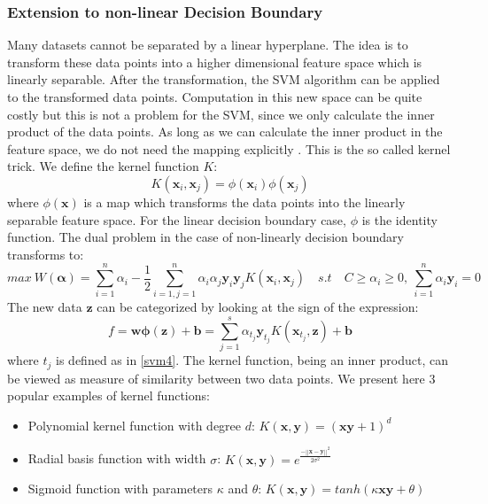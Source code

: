 \documentclass[a4paper,11pt,oneside]{article}
\begin{document}
\subsubsection*{Extension to non-linear Decision Boundary}
Many datasets cannot be separated by a linear hyperplane. The idea is to transform these data points
into a higher dimensional feature space which is linearly separable. After the transformation, the SVM algorithm can be applied to the transformed data points.
Computation in this new space can be quite costly but this is not a problem for the SVM, since we only calculate the inner product 
of the data points. As long as we can calculate the inner product in the feature space, we do not need the mapping explicitly \cite{law2006simple}.
This is the so called kernel trick. We define the kernel function $K$:
\begin{equation}
  K(\mathbf{x}_i,\mathbf{x}_j) = \phi(\mathbf{x}_i)\phi(\mathbf{x}_j)
\end{equation} where $\phi(\mathbf{x})$ is a map which transforms the data points into the linearly separable feature space.
For the linear decision boundary case, $\phi$ is the identity function. The dual problem in the case of non-linearly decision boundary
transforms to:
\begin{equation}\label{svm5}
  max \ W(\mathbf{\alpha}) = \sum_{i=1}^n \alpha_i - \frac{1}{2} \sum_{i=1,j=1}^n \alpha_i \alpha_j \mathbf{y}_i\mathbf{y}_jK(\mathbf{x}_i,\mathbf{x}_j)
  \quad s.t \quad C\geq\alpha_i \geq 0,\ \sum_{i=1}^n \alpha_i\mathbf{y}_i = 0
\end{equation}
The new data $\mathbf{z}$ can be categorized by looking at the sign of the expression:
\begin{equation}\label{svm6}
  f = \mathbf{w}\mathbf{\phi(z)}+\mathbf{b} = \sum_{j=1}^s \alpha_{t_j}\mathbf{y}_{t_j}K(\mathbf{x}_{t_j},\mathbf{z})+\mathbf{b} 
\end{equation} where $t_j$ is defined as in \ref{svm4}.
The kernel function, being an inner product, can be viewed as measure of similarity between two data points.
We present here 3 popular examples of kernel functions:
\begin{itemize}
  \item Polynomial kernel function with degree $d$:
  \begin{math}
    K(\mathbf{x},\mathbf{y}) = (\mathbf{x}\mathbf{y} + 1)^d
  \end{math}
  \item Radial basis function with width $\sigma$:
  \begin{math}
    K(\mathbf{x},\mathbf{y}) = e^{\frac{-||\mathbf{x}-\mathbf{y}||^2}{2\sigma^2}}
  \end{math}
  \item Sigmoid function with parameters $\kappa$ and $\theta$: 
  \begin{math}
    K(\mathbf{x},\mathbf{y}) = tanh(\kappa \mathbf{x} \mathbf{y}+\theta)
  \end{math}
\end{itemize}
\end{document}
